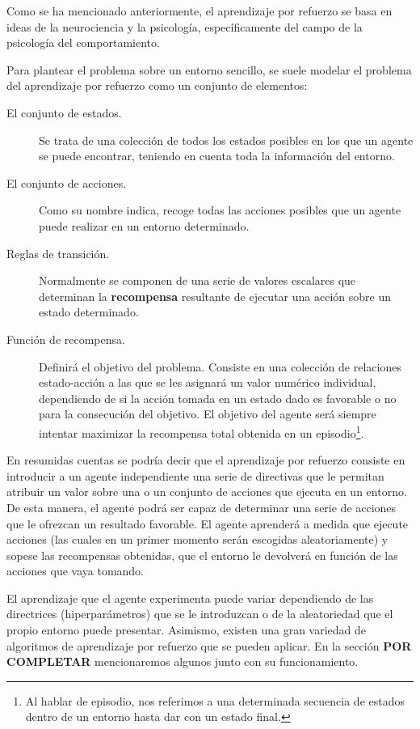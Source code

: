 \documentclass[11pt,spanish,listoffigures,listoftables]{tfgetsinf}
\begin{document}
Como se ha mencionado anteriormente, el aprendizaje por refuerzo se basa en ideas de la neurociencia y la psicología, específicamente del campo de la psicología del comportamiento. 


Para plantear el problema sobre un entorno sencillo, se suele modelar el problema del aprendizaje por refuerzo como un conjunto de elementos:

\begin{description}
	\item[El conjunto de estados.] Se trata de una colección de todos los estados posibles en los que un agente se puede encontrar, teniendo en cuenta toda la información del entorno.
	\item[El conjunto de acciones.] Como su nombre indica, recoge todas las acciones posibles que un agente puede realizar en un entorno determinado.
	\item[Reglas de transición.] Normalmente se componen de una serie de valores escalares que determinan la \textbf{recompensa} resultante de ejecutar una acción sobre un estado determinado.
	\item[Función de recompensa.] Definirá el objetivo del problema. Consiste en una colección de relaciones estado-acción a las que se les asignará un valor numérico individual, dependiendo de si la acción tomada en un estado dado es favorable o no para la consecución del objetivo. El objetivo del agente será siempre intentar maximizar la recompensa total obtenida en un episodio\footnote{Al hablar de episodio, nos referimos a una determinada secuencia de estados dentro de un entorno hasta dar con un estado final.}.
	
\end{description}

En resumidas cuentas se podría decir que el aprendizaje por refuerzo consiste en introducir a un agente independiente una serie de directivas que le permitan atribuir un valor sobre una o un conjunto de acciones que ejecuta en un entorno. De esta manera, el agente podrá ser capaz de determinar una serie de acciones que le ofrezcan un resultado favorable. El agente aprenderá a medida que ejecute acciones (las cuales en un primer momento serán escogidas aleatoriamente) y sopese las recompensas obtenidas, que el entorno le devolverá en función de las acciones que vaya tomando.

El aprendizaje que el agente experimenta puede variar dependiendo de las directrices (hiperparámetros) que se le introduzcan o de la aleatoriedad que el propio entorno puede presentar. Asimismo, existen una gran variedad de algoritmos de aprendizaje por refuerzo que se pueden aplicar. En la sección \textbf{POR COMPLETAR} mencionaremos algunos junto con su funcionamiento.
\end{document}
